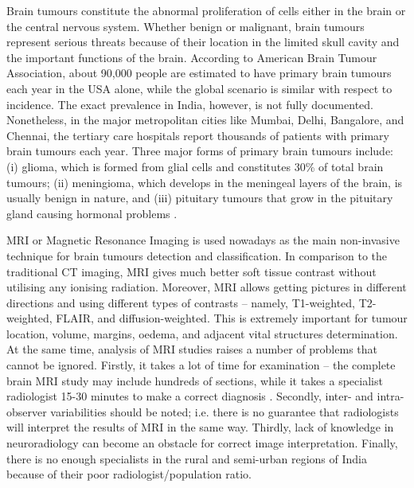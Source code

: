 \documentclass[final,3p,times,number]{elsarticle}
\begin{document}
Brain tumours constitute the abnormal proliferation of cells either in the brain or the central nervous system. Whether benign or malignant, brain tumours represent serious threats because of their location in the limited skull cavity and the important functions of the brain. According to American Brain Tumour Association, about 90,000 people are estimated to have primary brain tumours each year in the USA alone, while the global scenario is similar with respect to incidence. The exact prevalence in India, however, is not fully documented. Nonetheless, in the major metropolitan cities like Mumbai, Delhi, Bangalore, and Chennai, the tertiary care hospitals report thousands of patients with primary brain tumours each year. Three major forms of primary brain tumours include: (i) glioma, which is formed from glial cells and constitutes 30\% of total brain tumours; (ii) meningioma, which develops in the meningeal layers of the brain, is usually benign in nature, and (iii) pituitary tumours that grow in the pituitary gland causing hormonal problems \cite{ref1,ref2}.

MRI or Magnetic Resonance Imaging is used nowadays as the main non-invasive technique for brain tumours detection and classification. In comparison to the traditional CT imaging, MRI gives much better soft tissue contrast without utilising any ionising radiation. Moreover, MRI allows getting pictures in different directions and using different types of contrasts -- namely, T1-weighted, T2-weighted, FLAIR, and diffusion-weighted. This is extremely important for tumour location, volume, margins, oedema, and adjacent vital structures determination. At the same time, analysis of MRI studies raises a number of problems that cannot be ignored. Firstly, it takes a lot of time for examination -- the complete brain MRI study may include hundreds of sections, while it takes a specialist radiologist 15-30 minutes to make a correct diagnosis \cite{ref20,ref21}. Secondly, inter- and intra-observer variabilities should be noted; i.e. there is no guarantee that radiologists will interpret the results of MRI in the same way. Thirdly, lack of knowledge in neuroradiology can become an obstacle for correct image interpretation. Finally, there is no enough specialists in the rural and semi-urban regions of India because of their poor radiologist/population ratio.
\end{document}
